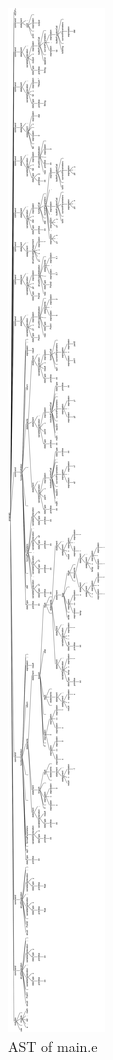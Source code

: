 \begin{figure}[h!]
	\centering
	\includegraphics[scale=0.07]{./img/parse_tree}
	\caption[AST of {\ttfamily main.e}]{AST of {\ttfamily main.e}}
	\label{fig:parse_tree}
\end{figure}
\noindent


